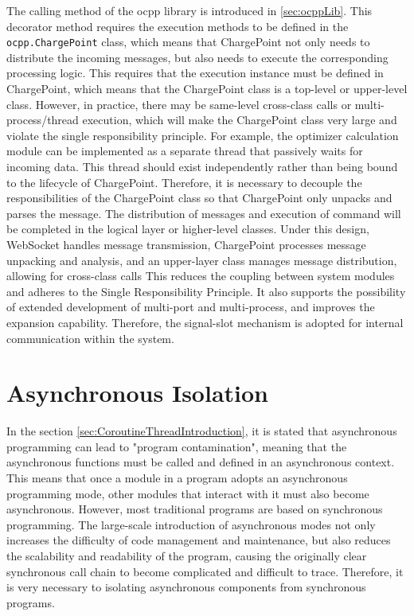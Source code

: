 \documentclass[
english,
ruledheaders=section,%
class=report,%
thesis={type=Report},%
accentcolor=9c,%
custommargins=true,%
marginpar=false,%
parskip=half-,%
fontsize=11pt,%
logofile={img/tuda_logo.pdf}, %
]{tudapub}
\begin{document}
    The calling method of the ocpp library is introduced in \ref{sec:ocppLib}. This decorator method requires the execution methods to be defined in the \texttt{ocpp.ChargePoint} class, which means that ChargePoint not only needs to distribute the incoming messages, but also needs to execute the corresponding processing logic. This requires that the execution instance must be defined in ChargePoint, which means that the ChargePoint class is a top-level or upper-level class. However, in practice, there may be same-level cross-class calls or multi-process/thread execution, which will make the ChargePoint class very large and violate the single responsibility principle. For example, the optimizer calculation module can be implemented as a separate thread that passively waits for incoming data. This thread should exist independently rather than being bound to the lifecycle of ChargePoint. Therefore, it is necessary to decouple the responsibilities of the ChargePoint class so that ChargePoint only unpacks and parses the message. The distribution of messages and execution of command will be completed in the logical layer or higher-level classes. Under this design, WebSocket handles message transmission, ChargePoint processes message unpacking and analysis, and an upper-layer class manages message distribution, allowing for cross-class calls This reduces the coupling between system modules and adheres to the Single Responsibility Principle. It also supports the possibility of extended development of multi-port and multi-process, and improves the expansion capability. Therefore, the signal-slot mechanism is adopted for internal communication within the system.

    \section{Asynchronous Isolation}
    \label{sec:asyncIsolation}

    In the section \ref{sec:CoroutineThreadIntroduction}, it is stated that asynchronous programming can lead to "program contamination", meaning that the asynchronous functions must be called and defined in an asynchronous context. This means that once a module in a program adopts an asynchronous programming mode, other modules that interact with it must also become asynchronous. However, most traditional programs are based on synchronous programming. The large-scale introduction of asynchronous modes not only increases the difficulty of code management and maintenance, but also reduces the scalability and readability of the program, causing the originally clear synchronous call chain to become complicated and difficult to trace. Therefore, it is very necessary to isolating asynchronous components from synchronous programs.
\end{document}
